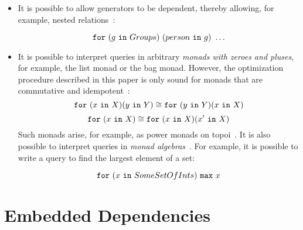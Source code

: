 \documentclass[preprint]{sigplanconf}
\newcommand{\FOR}{{\tt for} \ }
\newcommand{\IN}{ \ {\tt in} \ }
\begin{document}
\begin{itemize} 
\item  It is possible to allow generators to be dependent, thereby allowing, for example, nested relations~\cite{Popa99anequational}:
\begin{normalsize}
$$ \FOR (g \IN Groups) \ (person \IN g) \ \ldots $$
\end{normalsize}
\item It is possible to interpret queries in arbitrary {\it monads with zeroes and pluses}, for example, the list monad or the bag monad.  However, the  optimization procedure described in this paper is only sound for monads that are commutative and idempotent~\cite{Popa99anequational}:
$$
\FOR (x \IN X)(y \IN Y)  \cong \FOR (y \IN Y) (x \IN X) 
$$
$$
\FOR (x \IN X) \cong \FOR (x \IN X)(x' \IN X) 
$$
Such monads arise, for example, as power monads on topoi~\cite{BW}.  It is also possible to interpret queries in {\it monad algebras}~\cite{755736}.  For example, it is possible to write a query to find the largest element of a set: 
\begin{normalsize}
$$ \FOR (x \IN SomeSetOfInts) \ {\tt max} \ x $$
\end{normalsize}

\end{itemize}

\section{Embedded Dependencies}
\end{document}
